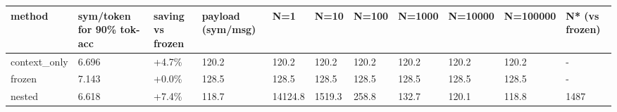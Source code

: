 \begin{tabular}{lllllllllll}
\hline
method & sym/token for 90\% tok-acc & saving vs frozen & payload (sym/msg) & N=1 & N=10 & N=100 & N=1000 & N=10000 & N=100000 & N* (vs frozen) \\
\hline
context\_only & 6.696 & +4.7\% & 120.2 & 120.2 & 120.2 & 120.2 & 120.2 & 120.2 & 120.2 & - \\
frozen & 7.143 & +0.0\% & 128.5 & 128.5 & 128.5 & 128.5 & 128.5 & 128.5 & 128.5 & - \\
nested & 6.618 & +7.4\% & 118.7 & 14124.8 & 1519.3 & 258.8 & 132.7 & 120.1 & 118.8 & 1487 \\
\hline
\end{tabular}
